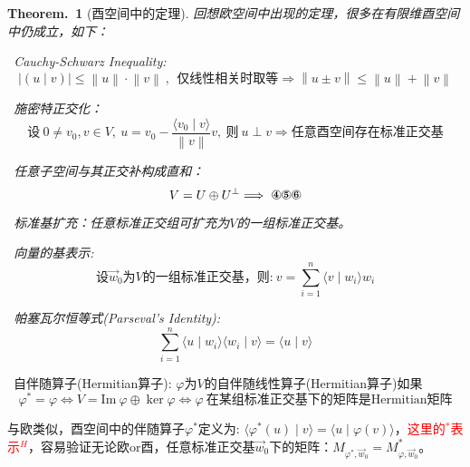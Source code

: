 \documentclass[zihao=5,UTF8]{report}
\theoremstyle{mystyle} %
\newtheorem{theorem}{Theorem.\,}
\begin{document}
\begin{theorem}[酉空间中的定理]\label{酉空间中的定理}
回想欧空间中出现的定理，很多在有限维酉空间中仍成立，如下：
\par
{}\ Cauchy-Schwarz Inequality: 
\begin{equation*}
    |(u\mid v) | \le \left \| u \right \|\cdot\left \| v \right \| \ ,\ \ \text{仅线性相关时取等}\Longrightarrow \left \| u \pm v \right \| \le \left \| u \right \| + \left \| v \right \|
\end{equation*}\par
{}\ 施密特正交化：
\begin{equation*}
    \text{设}\ 0 \ne v_0, v \in V,\ u = v_0 - \frac{\langle v_0\mid v\rangle }{ \left \| v \right \| }v,\ \text{则}\ u\perp v \Longrightarrow \text{任意酉空间存在标准正交基}
\end{equation*}\par
{}\ 任意子空间与其正交补构成直和：
\begin{equation*}
    V = U\oplus U^{\perp} \Longrightarrow\  \text{\ding{175}\ding{176}\ding{177}}
\end{equation*}    \par
{}\ 标准基扩充：任意标准正交组可扩充为$V$的一组标准正交基。\par
{}\ 向量的基表示:
\begin{equation*}
    \text{设$\vec{w}_0$为$V$的一组标准正交基，则:}\ v = \sum_{i=1}^{n}\langle v \mid w_i \rangle w_i
\end{equation*}    \par
{}\ 帕塞瓦尔恒等式(Parseval's Identity):
\begin{equation*}
    \sum_{i=1}^{n} \langle u \mid w_i \rangle \langle w_i  \mid v \rangle = \langle u \mid v \rangle
\end{equation*}    \par
\end{theorem}
\ 自伴随算子(Hermitian算子):
$\varphi$为$V$的自伴随线性算子(Hermitian算子)如果
\begin{equation*}
    \varphi^* = \varphi \Longleftrightarrow V = \text{Im}\ \varphi \oplus \ker \varphi \Longleftrightarrow \varphi\ \text{在某组标准正交基下的矩阵是Hermitian矩阵}    
\end{equation*}
{\par\color{gray}\small
与欧类似，酉空间中的伴随算子$\varphi^*$定义为: $\langle \varphi^*(u) \mid v \rangle = \langle u \mid \varphi(v) \rangle$，\textcolor{red}{这里的$^*$表示$^H$}，容易验证无论欧or酉，任意标准正交基$\vec{w}_0$下的矩阵：$M_{\varphi^*,\vec{w}_0}  = M_{\varphi,\vec{w}_0}^* $。\par}
\end{document}
